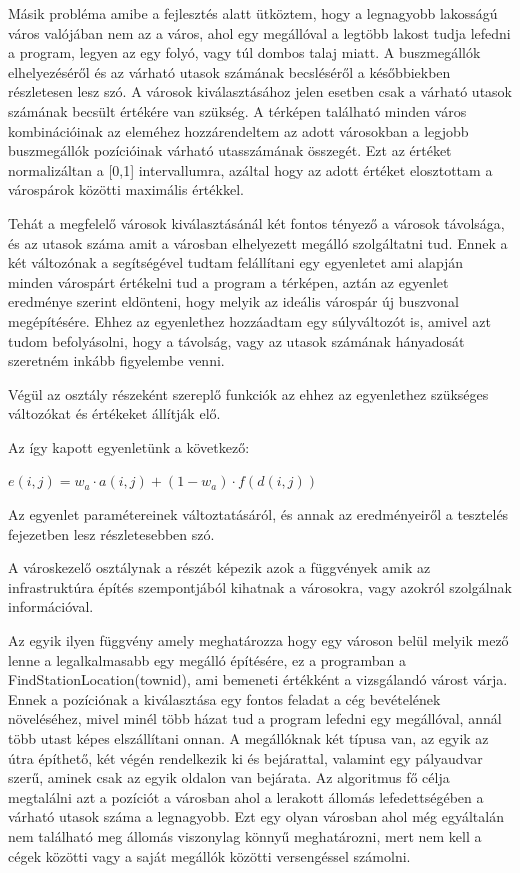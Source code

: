 Másik probléma amibe a fejlesztés alatt ütköztem, hogy a legnagyobb lakosságú város valójában nem az a város, ahol egy megállóval a legtöbb lakost tudja lefedni a program, legyen az egy folyó, vagy túl dombos talaj miatt. A buszmegállók elhelyezéséről és az várható utasok számának becsléséről a későbbiekben részletesen lesz szó. A városok kiválasztásához jelen esetben csak a várható utasok számának becsült értékére van szükség. A térképen található minden város kombinációinak az eleméhez hozzárendeltem az adott városokban a legjobb buszmegállók pozícióinak várható utasszámának összegét. Ezt az értéket normalizáltan a [0,1] intervallumra, azáltal hogy az adott értéket elosztottam a várospárok közötti maximális értékkel.

Tehát a megfelelő városok kiválasztásánál két fontos tényező a városok távolsága, és az utasok száma amit a városban elhelyezett megálló szolgáltatni tud. Ennek a két változónak a segítségével tudtam felállítani egy egyenletet ami alapján minden várospárt értékelni tud a program a térképen, aztán az egyenlet eredménye szerint eldönteni, hogy melyik az ideális várospár új buszvonal megépítésére. Ehhez az egyenlethez hozzáadtam egy súlyváltozót is, amivel azt tudom befolyásolni, hogy a távolság, vagy az utasok számának hányadosát szeretném inkább figyelembe venni.

Végül az osztály részeként szereplő funkciók az ehhez az egyenlethez szükséges változókat és értékeket állítják elő.

Az így kapott egyenletünk a következő:
\begin{center}
	$ e(i,j)=w_{a} \cdot a(i,j)+(1-w_{a}) \cdot f(d(i,j)) $
\end{center}


Az egyenlet paramétereinek változtatásáról, és annak az eredményeiről a tesztelés fejezetben lesz részletesebben szó.


A városkezelő osztálynak a részét képezik azok a függvények amik az infrastruktúra építés szempontjából kihatnak a városokra, vagy azokról szolgálnak információval.

Az egyik ilyen függvény amely meghatározza hogy egy városon belül melyik mező lenne a legalkalmasabb egy megálló építésére, ez a programban a FindStationLocation(townid), ami bemeneti értékként a vizsgálandó várost várja. Ennek a pozíciónak a kiválasztása egy fontos feladat a cég bevételének növeléséhez, mivel minél több házat tud a program lefedni egy megállóval, annál több utast képes elszállítani onnan. A megállóknak két típusa van, az egyik az útra építhető, két végén rendelkezik ki és bejárattal, valamint egy pályaudvar szerű, aminek csak az egyik oldalon van bejárata. Az algoritmus fő célja megtalálni azt a pozíciót a városban ahol a lerakott állomás lefedettségében a várható utasok száma a legnagyobb. Ezt egy olyan városban ahol még egyáltalán nem található meg állomás viszonylag könnyű meghatározni, mert nem kell a cégek közötti vagy a saját megállók közötti versengéssel számolni.

